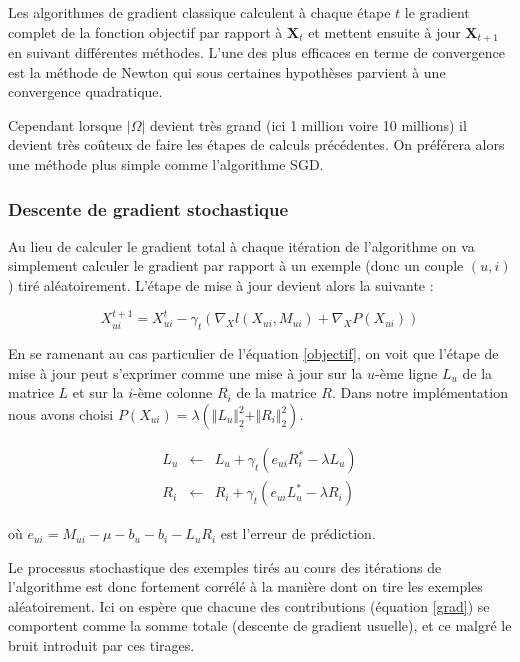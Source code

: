 \documentclass[10pt,a4paper]{article}
\begin{document}
Les algorithmes de gradient classique calculent à chaque étape $t$ le gradient complet de la fonction objectif par rapport à $\textbf{X}_t$ et mettent ensuite à jour $\textbf{X}_{t+1}$ en suivant différentes méthodes. L'une des plus efficaces en terme de convergence est la méthode de Newton qui sous certaines hypothèses parvient à une convergence quadratique. 

Cependant lorsque $| \Omega |$ devient très grand (ici 1 million voire 10 millions) il devient très coûteux de faire les étapes de calculs précédentes. On préférera alors une méthode plus simple comme l'algorithme SGD.

\subsubsection*{Descente de gradient stochastique}

Au lieu de calculer le gradient total à chaque itération de l'algorithme on va simplement calculer le gradient par rapport à un exemple (donc un couple $(u,i)$)  tiré aléatoirement. L'étape de mise à jour devient alors la suivante :

\begin{equation}
\label{grad}
X_{ui}^{t+1} = X_{ui}^t-\gamma_t\left(\nabla_Xl(X_{ui},M_{ui})+\nabla_XP(X_{ui})\right)
\end{equation}


En se ramenant au cas particulier de l'équation \eqref{objectif}, on voit que l'étape de mise à jour peut s'exprimer comme une mise à jour sur la $u$-ème ligne $L_u$ de la matrice $L$ et sur la $i$-ème colonne $R_i$ de la matrice $R$. Dans notre implémentation nous avons choisi $P(X_{ui}) = \lambda\left(\Vert L_u \Vert_2^2 + \Vert R_i \Vert_2^2\right)$.


\begin{eqnarray}
\label{grad1}
L_u & \leftarrow & L_u + \gamma_t\left(e_{ui}R_i^*-\lambda L_u  \right) \\
R_i & \leftarrow & R_i  + \gamma_t\left(e_{ui}L_u^*-\lambda R_i  \right)
\label{grad2}
\end{eqnarray}

où $e_{ui} = M_{ui} -  \mu - b_u  - b_i-L_{u}R_{i} $ est l'erreur de prédiction.

Le processus stochastique des exemples tirés au cours des itérations de l'algorithme est donc fortement corrélé à la manière dont on tire les exemples aléatoirement. Ici on espère que chacune des contributions (équation \eqref{grad}) se comportent comme la somme totale (descente de gradient usuelle), et ce malgré le bruit introduit par ces tirages.
\end{document}

